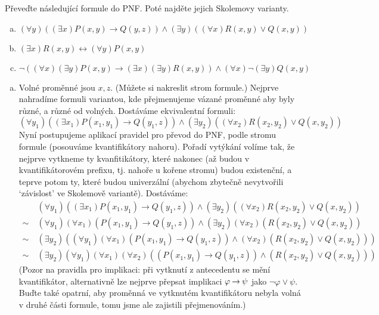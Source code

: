 \begin{problem} 
    
    Převeďte následující formule do PNF. Poté najděte jejich Skolemovy varianty.
    \begin{enumerate}[(a)]
        \item $(\forall y)((\exists x)P(x,y)\to Q(y,z))\wedge (\exists y)((\forall x)R(x,y)\vee Q(x,y))$
        \item $(\exists x)R(x,y)\leftrightarrow (\forall y)P(x,y)$
        \item $\neg((\forall x)(\exists y)P(x,y)\to (\exists x)(\exists y)R(x,y))\wedge(\forall x)\neg(\exists y)Q(x,y)$
    \end{enumerate}

    \begin{solution}

        \begin{enumerate}[(a)]
            \item Volné proměnné jsou $x,z$. (Můžete si nakreslit strom formule.) Nejprve nahradíme formuli variantou, kde přejmenujeme vázané proměnné aby byly různé, a různé od volných. Dostáváme ekvivalentní formuli:
            $$
            (\forall y_1)((\exists x_1)P(x_1,y_1)\to Q(y_1,z))\wedge (\exists y_2)((\forall x_2)R(x_2,y_2)\vee Q(x,y_2))
            $$
            Nyní postupujeme aplikací pravidel pro převod do PNF, podle stromu formule (posouváme kvantifikátory nahoru). Pořadí vytýkání volíme tak, že nejprve vytkneme ty kvanfitikátory, které nakonec (až budou v kvantifikátorovém prefixu, tj. nahoře u kořene stromu) budou existenční, a teprve potom ty, které budou univerzální (abychom zbytečně nevytvořili `závislost' ve Skolemově variantě). Dostáváme:
            \begin{align*}
                &(\forall y_1)((\exists x_1)P(x_1,y_1)\to Q(y_1,z))\wedge (\exists y_2)((\forall x_2)R(x_2,y_2)\vee Q(x,y_2))\\
                \sim\ & (\forall y_1)(\forall x_1)(P(x_1,y_1)\to Q(y_1,z))\wedge (\exists y_2)(\forall x_2)(R(x_2,y_2)\vee Q(x,y_2))\\
                \sim\ & (\exists y_2)((\forall y_1)(\forall x_1)(P(x_1,y_1)\to Q(y_1,z))\wedge (\forall x_2)(R(x_2,y_2)\vee Q(x,y_2)))\\
                \sim\ & (\exists y_2)(\forall y_1)(\forall x_1)(\forall x_2)((P(x_1,y_1)\to Q(y_1,z))\wedge (R(x_2,y_2)\vee Q(x,y_2)))
            \end{align*}
            (Pozor na pravidla pro implikaci: při vytknutí z antecedentu se mění kvantifikátor, alternativně lze nejprve přepsat implikaci $\varphi\mathbin{\rightarrow}\psi$ jako $\neg\varphi\lor\psi$. Buďte také opatrní, aby proměnná ve vytknutém kvantifikátoru nebyla volná v druhé části formule, tomu jsme ale zajistili přejmenováním.)


\end{enumerate}
\end{solution}
\end{problem}
